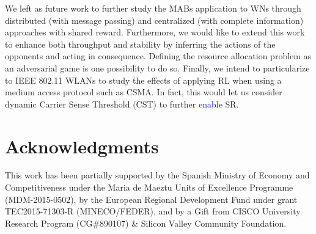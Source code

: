 \documentclass[preprint,12pt]{elsarticle}
\newcommand{\francesc}[1]{\textcolor{blue}{#1}}
\begin{document}
We left as future work to further study the MABs application to WNs through distributed (with message passing) and centralized (with complete information) approaches with shared reward. Furthermore, we would like to extend this work to enhance both throughput and stability by inferring the actions of the opponents and acting in consequence. Defining the resource allocation problem as an adversarial game is one possibility to do so. Finally, we intend to particularize to IEEE 802.11 WLANs to study the effects of applying RL when using a medium access protocol such as CSMA. In fact, this would let us consider dynamic Carrier Sense Threshold (CST) to further \francesc{enable} SR.

\section*{Acknowledgments}
This work has been partially supported by the Spanish Ministry of Economy and Competitiveness under the Maria de Maeztu Units of Excellence Programme (MDM-2015-0502), by the European Regional Development Fund under grant TEC2015-71303-R (MINECO/FEDER), and by a Gift from CISCO University Research Program (CG\#890107) \& Silicon Valley Community Foundation.

\newpage


\end{document}
